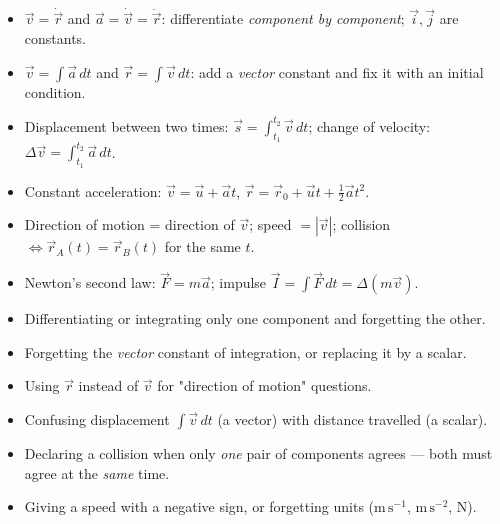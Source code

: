 \documentclass[11pt]{article}
\begin{document}
\begin{aretenir}
\begin{itemize}
\item $\vec{v} = \dot{\vec{r}}$ and $\vec{a} = \dot{\vec{v}} = \ddot{\vec{r}}$: differentiate \emph{component by component}; $\vec{i}, \vec{j}$ are constants.
\item $\vec{v} = \int \vec{a}\, dt$ and $\vec{r} = \int \vec{v}\, dt$: add a \emph{vector} constant and fix it with an initial condition.
\item Displacement between two times: $\vec{s} = \int_{t_1}^{t_2} \vec{v}\, dt$; change of velocity: $\Delta\vec{v} = \int_{t_1}^{t_2} \vec{a}\, dt$.
\item Constant acceleration: $\vec{v} = \vec{u} + \vec{a}t$, $\vec{r} = \vec{r}_0 + \vec{u}t + \tfrac{1}{2}\vec{a}t^2$.
\item Direction of motion = direction of $\vec{v}$; speed $= |\vec{v}|$; collision $\Leftrightarrow \vec{r}_A(t) = \vec{r}_B(t)$ for the same $t$.
\item Newton's second law: $\vec{F} = m\vec{a}$; impulse $\vec{I} = \int \vec{F}\, dt = \Delta(m\vec{v})$.
\end{itemize}
\end{aretenir}

\begin{attention}
\begin{itemize}
\item Differentiating or integrating only one component and forgetting the other.
\item Forgetting the \emph{vector} constant of integration, or replacing it by a scalar.
\item Using $\vec{r}$ instead of $\vec{v}$ for "direction of motion" questions.
\item Confusing displacement $\int \vec{v}\,dt$ (a vector) with distance travelled (a scalar).
\item Declaring a collision when only \emph{one} pair of components agrees — both must agree at the \emph{same} time.
\item Giving a speed with a negative sign, or forgetting units ($\mathrm{m\,s^{-1}}$, $\mathrm{m\,s^{-2}}$, N).
\end{itemize}
\end{attention}
\end{document}
